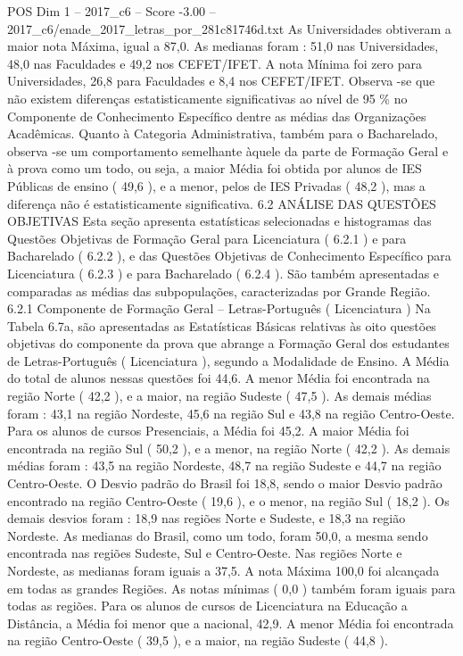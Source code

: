 \begin{textsample}{POS Dim 1 – 2017\_c6 – Score -3.00 – 2017\_c6/enade\_2017\_letras\_por\_281c81746d.txt}
As Universidades obtiveram a maior nota Máxima, igual a 87,0.
As medianas foram : 51,0 nas Universidades, 48,0 nas Faculdades e 49,2 nos CEFET/IFET.
A nota Mínima foi zero para Universidades, 26,8 para Faculdades e 8,4 nos CEFET/IFET.
Observa -se que não existem diferenças estatisticamente significativas ao nível de 95 \% no Componente de Conhecimento Específico dentre as médias das Organizações Acadêmicas.
Quanto à Categoria Administrativa, também para o Bacharelado, observa -se um comportamento semelhante àquele da parte de Formação Geral e à prova como um todo, ou seja, a maior Média foi obtida por alunos de IES Públicas de ensino ( 49,6 ), e a menor, pelos de IES Privadas ( 48,2 ), mas a diferença não é estatisticamente significativa. 6.2 ANÁLISE DAS QUESTÕES OBJETIVAS Esta seção apresenta estatísticas selecionadas e histogramas das Questões Objetivas de Formação Geral para Licenciatura ( 6.2.1 ) e para Bacharelado ( 6.2.2 ), e das Questões Objetivas de Conhecimento Específico para Licenciatura ( 6.2.3 ) e para Bacharelado ( 6.2.4 ).
São também apresentadas e comparadas as médias das subpopulações, caracterizadas por Grande Região. 6.2.1 Componente de Formação Geral – Letras-Português ( Licenciatura ) Na Tabela 6.7a, são apresentadas as Estatísticas Básicas relativas às oito questões objetivas do componente da prova que abrange a Formação Geral dos estudantes de Letras-Português ( Licenciatura ), segundo a Modalidade de Ensino.
A Média do total de alunos nessas questões foi 44,6.
A menor Média foi encontrada na região Norte ( 42,2 ), e a maior, na região Sudeste ( 47,5 ).
As demais médias foram : 43,1 na região Nordeste, 45,6 na região Sul e 43,8 na região Centro-Oeste.
Para os alunos de cursos Presenciais, a Média foi 45,2.
A maior Média foi encontrada na região Sul ( 50,2 ), e a menor, na região Norte ( 42,2 ).
As demais médias foram : 43,5 na região Nordeste, 48,7 na região Sudeste e 44,7 na região Centro-Oeste.
O Desvio padrão do Brasil foi 18,8, sendo o maior Desvio padrão encontrado na região Centro-Oeste ( 19,6 ), e o menor, na região Sul ( 18,2 ).
Os demais desvios foram : 18,9 nas regiões Norte e Sudeste, e 18,3 na região Nordeste.
As medianas do Brasil, como um todo, foram 50,0, a mesma sendo encontrada nas regiões Sudeste, Sul e Centro-Oeste.
Nas regiões Norte e Nordeste, as medianas foram iguais a 37,5.
A nota Máxima 100,0 foi alcançada em todas as grandes Regiões.
As notas mínimas ( 0,0 ) também foram iguais para todas as regiões.
Para os alunos de cursos de Licenciatura na Educação a Distância, a Média foi menor que a nacional, 42,9.
A menor Média foi encontrada na região Centro-Oeste ( 39,5 ), e a maior, na região Sudeste ( 44,8 ).

\end{textsample}
